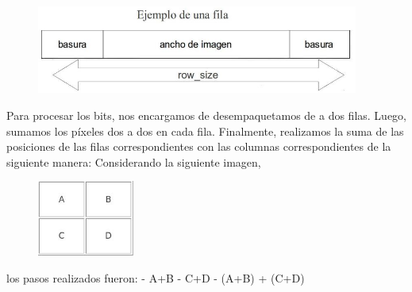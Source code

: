 \documentclass[10pt, a4paper]{article}
\begin{document}
\begin{itemize}
\begin{figure}[H] %
\begin{center}
\includegraphics[width=300pt]{./fila.jpg}
\end{center}
\end{figure}
Para procesar los bits, nos encargamos de desempaquetamos de a dos filas. Luego, sumamos los píxeles dos a dos en cada fila. Finalmente, realizamos la suma de las posiciones de las filas correspondientes con las columnas correspondientes de la siguiente manera:\newline
\newline
Considerando la siguiente imagen,
\begin{figure}[H] %
\begin{center}
\includegraphics[width=90pt]{./suma.jpg}
\end{center}
\end{figure}
los pasos realizados fueron:\newline
- A+B\newline
- C+D\newline
- (A+B) + (C+D)\newline


\end{itemize}
\end{document}
